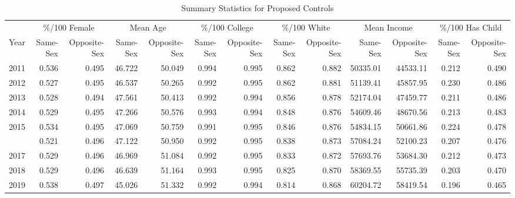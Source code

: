 \begin{table}

\caption{Summary Statistics for Proposed Controls}
\centering
\begin{tabular}[t]{rrrrrrrrrrrrr}
\toprule
\multicolumn{1}{c}{ } & \multicolumn{2}{c}{\%/100 Female} & \multicolumn{2}{c}{Mean Age} & \multicolumn{2}{c}{\%/100 College} & \multicolumn{2}{c}{\%/100 White} & \multicolumn{2}{c}{Mean Income} & \multicolumn{2}{c}{\%/100 Has Child} \\
\cmidrule(l{3pt}r{3pt}){2-3} \cmidrule(l{3pt}r{3pt}){4-5} \cmidrule(l{3pt}r{3pt}){6-7} \cmidrule(l{3pt}r{3pt}){8-9} \cmidrule(l{3pt}r{3pt}){10-11} \cmidrule(l{3pt}r{3pt}){12-13}
Year & Same-Sex & Opposite-Sex & Same-Sex & Opposite-Sex & Same-Sex & Opposite-Sex & Same-Sex & Opposite-Sex & Same-Sex & Opposite-Sex & Same-Sex & Opposite-Sex\\
\midrule
2011 & 0.536 & 0.495 & 46.722 & 50.049 & 0.994 & 0.995 & 0.862 & 0.882 & 50335.01 & 44533.11 & 0.212 & 0.490\\
2012 & 0.527 & 0.495 & 46.537 & 50.265 & 0.992 & 0.995 & 0.862 & 0.881 & 51139.41 & 45857.95 & 0.230 & 0.486\\
2013 & 0.528 & 0.494 & 47.561 & 50.413 & 0.992 & 0.994 & 0.856 & 0.878 & 52174.04 & 47459.77 & 0.211 & 0.486\\
2014 & 0.529 & 0.495 & 47.266 & 50.576 & 0.993 & 0.994 & 0.848 & 0.876 & 54609.46 & 48670.56 & 0.213 & 0.483\\
2015 & 0.534 & 0.495 & 47.069 & 50.759 & 0.991 & 0.995 & 0.846 & 0.876 & 54834.15 & 50661.86 & 0.224 & 0.478\\
\addlinespace
2016 & 0.521 & 0.496 & 47.122 & 50.950 & 0.992 & 0.995 & 0.838 & 0.873 & 57084.24 & 52100.23 & 0.207 & 0.476\\
2017 & 0.529 & 0.496 & 46.969 & 51.084 & 0.992 & 0.995 & 0.833 & 0.872 & 57693.76 & 53684.30 & 0.212 & 0.473\\
2018 & 0.529 & 0.496 & 46.639 & 51.164 & 0.993 & 0.995 & 0.825 & 0.870 & 58369.55 & 55735.39 & 0.203 & 0.470\\
2019 & 0.538 & 0.497 & 45.026 & 51.332 & 0.992 & 0.994 & 0.814 & 0.868 & 60204.72 & 58419.54 & 0.196 & 0.465\\
\bottomrule
\end{tabular}
\end{table}
